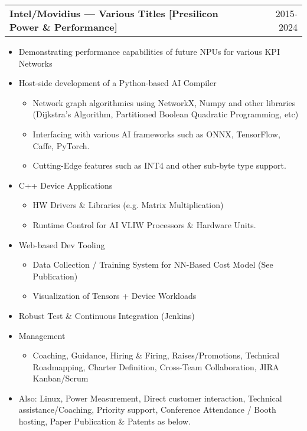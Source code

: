 \documentclass[a4paper,12pt]{article}
\makeatletter
\newenvironment{jobshort}[2]
    {
    \begin{tabularx}{\linewidth}{@{}l X r@{}}
    \textbf{#1} & \hfill &  #2 \\[3.75pt]
    \end{tabularx}
    }
    {
    }
\makeatother
\begin{document}
\begin{jobshort}{Intel/Movidius --- Various Titles [Presilicon Power \& Performance]}{2015-2024}
\begin{itemize}[noitemsep,topsep=0pt,parsep=0pt,partopsep=0pt]
    \item Demonstrating performance capabilities of future NPUs for various KPI Networks
    \item Host-side development of a Python-based AI Compiler
    \begin{itemize}
        \item Network graph algorithmics using NetworkX, Numpy and other libraries (Dijkstra's Algorithm, Partitioned Boolean Quadratic Programming, etc)
        \item Interfacing with various AI frameworks such as ONNX, TensorFlow, Caffe, PyTorch.
        \item Cutting-Edge features such as INT4 and other sub-byte type support.
    \end{itemize}
    \item C++ Device Applications
    \begin{itemize}
        \item HW Drivers \& Libraries (e.g. Matrix Multiplication)
        \item Runtime Control for AI VLIW Processors \& Hardware Units.
    \end{itemize}
    \item Web-based Dev Tooling 
    \begin{itemize}
        \item Data Collection / Training System for NN-Based Cost Model (See Publication)
        \item Visualization of Tensors + Device Workloads
    \end{itemize}
    \item Robust Test \& Continuous Integration (Jenkins)
    \item Management
    \begin{itemize}
        \item Coaching, Guidance, Hiring \& Firing, Raises/Promotions, Technical Roadmapping, Charter Definition, Cross-Team Collaboration, JIRA Kanban/Scrum
    \end{itemize}
    \item Also: Linux, Power Measurement, Direct customer interaction, Technical assistance/Coaching, Priority support, Conference Attendance / Booth hosting, Paper Publication \& Patents as below.
\end{itemize}
\end{jobshort}
\end{document}
